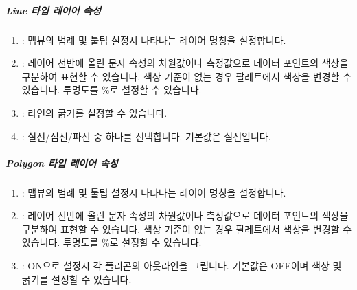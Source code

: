 \documentclass[letterpaper,10pt,english]{sphinxmanual}
\begin{document}
\subparagraph{Line 타입 레이어 속성}
\label{\detokenize{discovery/part04/map_chart:line}}\begin{quote}

\begin{figure}[H]
\centering

\noindent{}
\end{figure}
\end{quote}
\begin{enumerate}
\def\theenumi{\arabic{enumi}}
\def\labelenumi{\theenumi .}
\makeatletter\def\p@enumii{\p@enumi \theenumi .}\makeatother
\item {} 
: 맵뷰의 범례 및 툴팁 설정시 나타나는 레이어 명칭을 설정합니다.

\item {} 
: 레이어 선반에 올린 문자 속성의 차원값이나 측정값으로 데이터 포인트의 색상을 구분하여 표현할 수 있습니다. 색상 기준이 없는 경우 팔레트에서 색상을 변경할 수 있습니다. 투명도를 \%로 설정할 수 있습니다.

\item {} 
: 라인의 굵기를 설정할 수 있습니다.

\item {} 
: 실선/점선/파선 중 하나를 선택합니다. 기본값은 실선입니다.

\end{enumerate}


\subparagraph{Polygon 타입 레이어 속성}
\label{\detokenize{discovery/part04/map_chart:polygon}}\begin{quote}

\begin{figure}[H]
\centering

\noindent{}
\end{figure}
\end{quote}
\begin{enumerate}
\def\theenumi{\arabic{enumi}}
\def\labelenumi{\theenumi .}
\makeatletter\def\p@enumii{\p@enumi \theenumi .}\makeatother
\item {} 
: 맵뷰의 범례 및 툴팁 설정시 나타나는 레이어 명칭을 설정합니다.

\item {} 
: 레이어 선반에 올린 문자 속성의 차원값이나 측정값으로 데이터 포인트의 색상을 구분하여 표현할 수 있습니다. 색상 기준이 없는 경우 팔레트에서 색상을 변경할 수 있습니다. 투명도를 \%로 설정할 수 있습니다.

\item {} 
: ON으로 설정시 각 폴리곤의 아웃라인을 그립니다. 기본값은 OFF이며 색상 및 굵기를 설정할 수 있습니다.

\end{enumerate}
\end{document}

